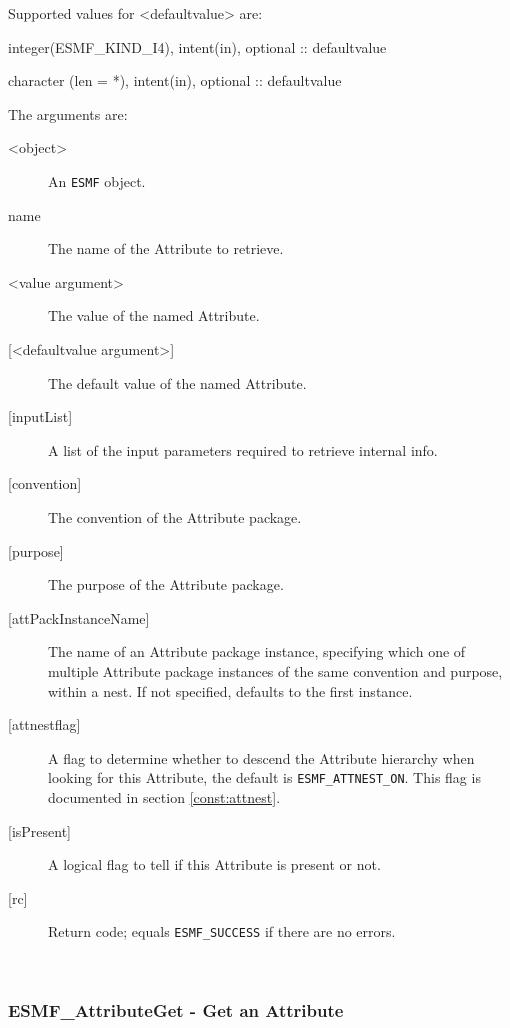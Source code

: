    Supported values for <defaultvalue> are:
   \begin{description}
   \item integer(ESMF\_KIND\_I4), intent(in), optional :: defaultvalue
   \item character (len = *), intent(in), optional :: defaultvalue
   \end{description}
  
   The arguments are:
   \begin{description}
   \item [<object>]
   An {\tt ESMF} object.
   \item [name]
   The name of the Attribute to retrieve.
   \item [<value argument>]
   The value of the named Attribute.
   \item [{[<defaultvalue argument>]}]
   The default value of the named Attribute.
   \item [{[inputList]}]
   A list of the input parameters required to retrieve internal info.
   \item [{[convention]}]
   The convention of the Attribute package.
   \item [{[purpose]}]
   The purpose of the Attribute package.
   \item [{[attPackInstanceName]}]
   The name of an Attribute package instance, specifying which one
   of multiple Attribute package instances of the same convention
   and purpose, within a nest. If not specified, defaults to the
   first instance.
   \item [{[attnestflag]}]
   A flag to determine whether to descend the
   Attribute hierarchy when looking for this Attribute, the default
   is {\tt ESMF\_ATTNEST\_ON}. This flag is documented in section
   \ref{const:attnest}.
   \item [{[isPresent]}]
   A logical flag to tell if this Attribute is present or not.
   \item [{[rc]}]
   Return code; equals {\tt ESMF\_SUCCESS} if there are no errors.
   \end{description}
  
   
 
\mbox{}\hrulefill\ 
 
\subsubsection [ESMF\_AttributeGet] {ESMF\_AttributeGet - Get an Attribute}


